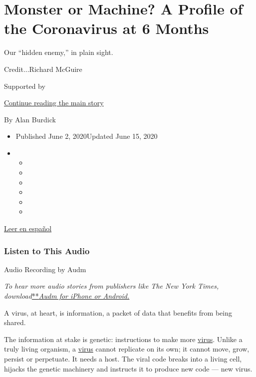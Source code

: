 \hypertarget{monster-or-machine-a-profile-of-the-coronavirus-at-6-months}{%
\section{Monster or Machine? A Profile of the Coronavirus at 6
Months}\label{monster-or-machine-a-profile-of-the-coronavirus-at-6-months}}

Our ``hidden enemy,'' in plain sight.

Credit...Richard McGuire

Supported by

\protect\hyperlink{after-sponsor}{Continue reading the main story}

By Alan Burdick

\begin{itemize}
\item
  Published June 2, 2020Updated June 15, 2020
\item
  \begin{itemize}
  \item
  \item
  \item
  \item
  \item
  \item
  \end{itemize}
\end{itemize}

\href{https://www.nytimes3xbfgragh.onion/es/2020/06/02/espanol/ciencia-y-tecnologia/perfil-coronavirus-covid.html}{Leer
en español}

\hypertarget{listen-to-this-audio}{%
\subsubsection{Listen to This Audio}\label{listen-to-this-audio}}

Audio Recording by Audm

\emph{To hear more audio stories from publishers like The New York
Times,
download}\href{https://www.audm.com/?utm_source=nytmag\&utm_medium=embed\&utm_campaign=left_behind_draper}{**}\href{https://www.audm.com/?utm_source=nyt\&utm_medium=embed\&utm_campaign=monster_or_machine}{\emph{Audm
for iPhone or Android.}}

A virus, at heart, is information, a packet of data that benefits from
being shared.

The information at stake is genetic: instructions to make more
\href{https://www.nytimes3xbfgragh.onion/2020/06/15/health/coronavirus-underlying-conditions.html}{virus}.
Unlike a truly living organism, a
\href{https://www.nytimes3xbfgragh.onion/2020/06/15/health/coronavirus-underlying-conditions.html}{virus}
cannot replicate on its own; it cannot move, grow, persist or
perpetuate. It needs a host. The viral code breaks into a living cell,
hijacks the genetic machinery and instructs it to produce new code ---
new virus.

